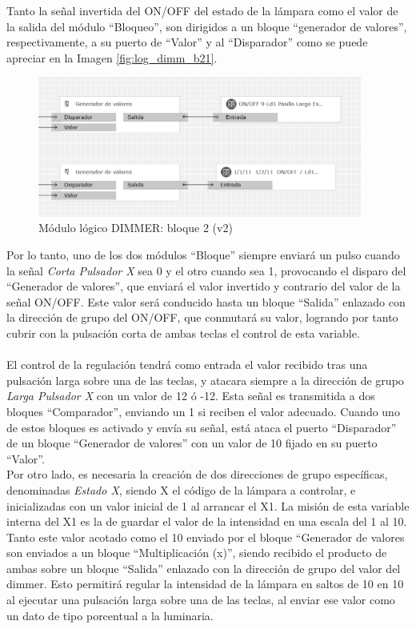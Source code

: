 Tanto la señal invertida del ON/OFF del estado de la lámpara como el valor de la salida del módulo “Bloqueo”, son dirigidos a un bloque “generador de valores”, respectivamente, a su puerto de “Valor” y al “Disparador” como se puede apreciar en la Imagen \ref{fig:log_dimm_b21}. 

\begin{figure}[H]
\includegraphics[width=0.95\textwidth]{figures/log_dimm_b22.png}  
\caption{Módulo lógico DIMMER: bloque 2 (v2)}
\label{fig:log_dimm_b22}
\end{figure}

Por lo tanto, uno de los dos módulos “Bloque” siempre enviará un pulso cuando la señal \textit{Corta Pulsador X} sea 0 y el otro cuando sea 1, provocando el disparo del “Generador de valores”, que enviará el valor invertido y contrario del valor de la señal ON/OFF. Este valor será conducido hasta un bloque “Salida” enlazado con la dirección de grupo del ON/OFF, que conmutará su valor, logrando por tanto cubrir con la pulsación corta de ambas teclas el control de esta variable.\\\\

El control de la regulación tendrá como entrada el valor recibido tras una pulsación larga sobre una de las teclas, y atacara siempre a la dirección de grupo \textit{Larga Pulsador X} con un valor de 12 ó -12. Esta señal es transmitida a dos bloques “Comparador”, enviando un 1 si reciben el valor adecuado. Cuando uno de estos bloques es activado y envía su señal, está ataca el puerto “Disparador” de un bloque “Generador de valores” con un valor de 10 fijado en su puerto “Valor”. \\
Por otro lado, es necesaria la creación de dos direcciones de grupo específicas, denominadas \textit{Estado X}, siendo X el código de la lámpara a controlar, e inicializadas con un valor inicial de 1 al arrancar el X1. La misión de esta variable interna del X1 es la de guardar el valor de la intensidad en una escala del 1 al 10. Tanto este valor acotado como el 10 enviado por el bloque “Generador de valores son enviados a un bloque “Multiplicación (x)”, siendo recibido el producto de ambas sobre un bloque “Salida” enlazado con la dirección de grupo del valor del dimmer. Esto permitirá regular la intensidad de la lámpara en saltos de 10 en 10 al ejecutar una pulsación larga sobre una de las teclas, al enviar ese valor como un dato de tipo porcentual a la luminaria.

